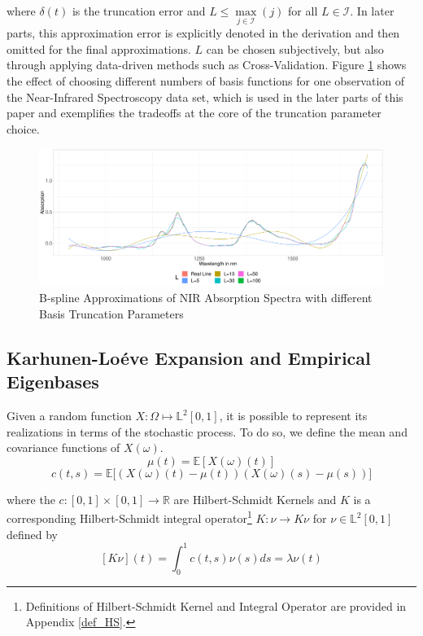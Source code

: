 \documentclass[11pt,twoside,a4paper]{article}
\begin{document}
	where $\delta(t)$ is the truncation error and $L \leq \max\limits_{j \in \mathcal{I}}(j)$ for all $L \in \mathcal{I}$.  In later parts, this approximation error is explicitly denoted in the derivation and then omitted for the final approximations. $L$ can be chosen subjectively, but also through applying data-driven methods such as Cross-Validation. Figure \ref{Different_Expansions} shows the effect of choosing different numbers of basis functions for one observation of the Near-Infrared Spectroscopy data set, which is used in the later parts of this paper and exemplifies the tradeoffs at the core of the truncation parameter choice.
			
	\begin{figure}[H]
		\includegraphics[width=\textwidth]{../Graphics/basis_expansions.pdf}
		\caption{B-spline Approximations of NIR Absorption Spectra with different Basis Truncation Parameters}
		\label{Different_Expansions}
	\end{figure}
	
	\subsection{Karhunen-Lo\'{e}ve Expansion and Empirical Eigenbases}\hypertarget{KL}{}
	Given a random function $X: \Omega \mapsto \mathbb{L}^2[0,1]$, it is possible to represent its realizations in terms of the stochastic process. To do so, we define the mean and covariance functions of $X(\omega)$.
	\begin{equation}\label{MeanFunction}
		\mu(t) = \mathbb{E}\left[ X(\omega)(t) \right]
	\end{equation}
	\begin{equation}\label{CovarianceFunction}
		c(t,s) = \mathbb{E}\big[ \left( X(\omega)(t) - \mu(t) \right) \left( X(\omega)(s) - \mu(s) \right) \big]
	\end{equation}

	where the $c: [0,1] \times [0,1] \rightarrow \mathbb{R}$ are Hilbert-Schmidt Kernels and $K$ is a corresponding Hilbert-Schmidt integral operator\footnote{Definitions of Hilbert-Schmidt Kernel and Integral Operator are provided in Appendix \ref{def_HS}.} $K : \nu \rightarrow K \nu$ for $\nu \in \mathbb{L}^{2}[0,1]$ defined by
	\begin{equation}\label{HSKernal}
		[K \nu](t) = \int_{0}^{1}c(t,s) \nu(s)ds = \lambda \nu(t)
	\end{equation}
\end{document}
